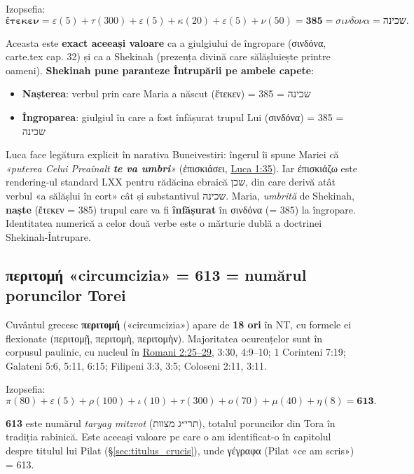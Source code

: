 \documentclass[12pt,a4paper,twoside,openany]{book}
\begin{document}
Izopsefia:
\[
\textbf{ἔτεκεν} = \varepsilon(5) + \tau(300) + \varepsilon(5) + \kappa(20) + \varepsilon(5) + \nu(50) = \mathbf{385} = \sigma\iota\nu\delta\acute{o}\nu\alpha = \textrm{שכינה}.
\]

Aceasta este \textbf{exact aceeași valoare} ca a giulgiului de îngropare (σινδόνα, carte.tex cap. 32) și ca a Shekinah (prezența divină care sălășluiește printre oameni). \textbf{Shekinah pune paranteze Întrupării pe ambele capete}:
\begin{itemize}
  \item \textbf{Nașterea}: verbul prin care Maria a născut (ἔτεκεν) = 385 = שכינה
  \item \textbf{Îngroparea}: giulgiul în care a fost înfășurat trupul Lui (σινδόνα) = 385 = שכינה
\end{itemize}

Luca face legătura explicit în narativa Buneivestiri: îngerul îi spune Mariei că \textit{«puterea Celui Preaînalt \textbf{te va umbri}»} (ἐπισκιάσει, \href{https://bibliaortodoxa.ro/carte.php?id=48\&cap=1\#35}{Luca 1:35}). Iar ἐπισκιάζω este rendering-ul standard LXX pentru rădăcina ebraică שכן, din care derivă atât verbul «a sălășlui în cort» cât și substantivul שכינה. Maria, \textit{umbrită} de Shekinah, \textbf{naște} (ἔτεκεν = 385) trupul care va fi \textbf{înfășurat} în σινδόνα (= 385) la îngropare. Identitatea numerică a celor două verbe este o mărturie dublă a doctrinei Shekinah-Întrupare.

\subsection{\texorpdfstring{περιτομή}{peritome} «circumcizia» = 613 = numărul poruncilor Torei}
\label{sec:peritome}

Cuvântul grecesc \textbf{περιτομή} («circumcizia») apare de \textbf{18 ori} în NT, cu formele ei flexionate (περιτομῇ, περιτομὴ, περιτομὴν). Majoritatea ocurențelor sunt în corpusul paulinic, cu nucleul în \href{https://bibliaortodoxa.ro/carte.php?id=70\&cap=2\#25}{Romani 2:25--29}, 3:30, 4:9--10; 1 Corinteni 7:19; Galateni 5:6, 5:11, 6:15; Filipeni 3:3, 3:5; Coloseni 2:11, 3:11.

Izopsefia:
\[
\pi(80) + \varepsilon(5) + \rho(100) + \iota(10) + \tau(300) + o(70) + \mu(40) + \eta(8) = \mathbf{613}.
\]

\textbf{613} este numărul \textit{taryag mitzvot} (תרי״ג מצוות), totalul poruncilor din Tora în tradiția rabinică. Este aceeași valoare pe care o am identificat-o în capitolul despre titulul lui Pilat (\S\ref{sec:titulus_crucis}), unde γέγραφα (Pilat «ce am scris») = 613.
\end{document}
